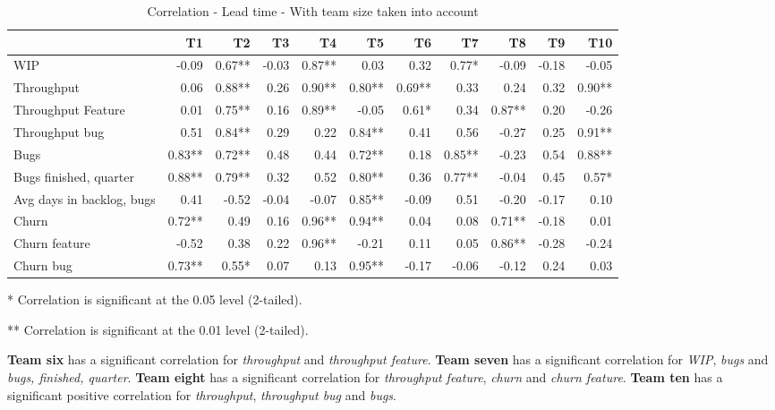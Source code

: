 \documentclass[UKenglish]{ifimaster}  %
\begin{document}
\begin{table}[H]
  \begin{adjustwidth}{-2.5cm}{}
 \centering
 \begin{tabular}{|l|r|r|r|r|r|r|r|r|r|r|}
\hline
 &  \bf{T1} & \bf{T2} & \bf{T3} & \bf{T4} & \bf{T5} & \bf{T6} & \bf{T7} & \bf{T8} & \bf{T9} & \bf{T10}\\ \hline
 WIP  & -0.09 & 0.67** & -0.03 & 0.87** & 0.03 & 0.32 & 0.77* & -0.09 & -0.18 & -0.05 \\ \hline
 Throughput  & 0.06 & 0.88** & 0.26 & 0.90** & 0.80** & 0.69** & 0.33 & 0.24 & 0.32 & 0.90** \\ \hline
 Throughput Feature  & 0.01 & 0.75** & 0.16 & 0.89** & -0.05 & 0.61* & 0.34 & 0.87** & 0.20 & -0.26 \\ \hline
 Throughput bug  & 0.51 & 0.84** & 0.29 & 0.22 & 0.84** & 0.41 & 0.56 & -0.27 & 0.25 & 0.91** \\ \hline
 Bugs  & 0.83** & 0.72** & 0.48 & 0.44 & 0.72** & 0.18 & 0.85** & -0.23 & 0.54 & 0.88** \\ \hline
 Bugs finished, quarter  & 0.88** & 0.79** & 0.32 & 0.52 & 0.80** & 0.36 & 0.77** & -0.04 & 0.45 & 0.57* \\ \hline
 Avg days in backlog, bugs  & 0.41 & -0.52 & -0.04 & -0.07 & 0.85** & -0.09 & 0.51 & -0.20 & -0.17 & 0.10 \\ \hline
 Churn  & 0.72** & 0.49 & 0.16 & 0.96** & 0.94** & 0.04 & 0.08 & 0.71** & -0.18 & 0.01 \\ \hline
 Churn feature  & -0.52 & 0.38 & 0.22 & 0.96** & -0.21 & 0.11 & 0.05 & 0.86** & -0.28 & -0.24 \\ \hline
 Churn bug  & 0.73** & 0.55* & 0.07 & 0.13 & 0.95** & -0.17 & -0.06 & -0.12 & 0.24 & 0.03 \\ \hline
\end{tabular}
 \caption{Correlation - Lead time - With team size taken into account}
 \label{corr:LT:V2}
 \centerline {* Correlation is significant at the 0.05 level (2-tailed).}
\centerline{** Correlation is significant at the 0.01 level (2-tailed).}
\end{adjustwidth}
\end{table}

\textbf{Team six} has a significant correlation for \textit{throughput} and \textit{throughput feature}. \textbf{Team seven} has a significant correlation for \textit{WIP}, \textit{bugs} and \textit{bugs, finished, quarter}. \textbf{Team eight} has a significant correlation for \textit{throughput feature}, \textit{churn} and \textit{churn feature}. \textbf{Team ten} has a significant positive correlation for \textit{throughput}, \textit{throughput bug} and \textit{bugs}.  
\end{document}
